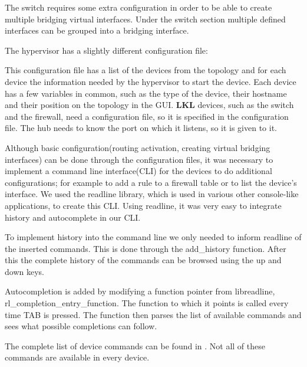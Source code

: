 The switch requires some extra configuration in order to be able to create multiple bridging virtual interfaces. 
Under the switch section multiple defined interfaces can be grouped into a bridging interface.

The hypervisor has a slightly different configuration file:
\lstset{language=text,caption=Example hypervisor configuration file,label=lst:hconf}

This configuration file has a list of the devices from the topology and for each device the information needed by the hypervisor to
start the device. Each device has a few variables in common, such as the type of the device, their hostname and their position on
the topology in the GUI. \textbf{LKL} devices, such as the switch and the firewall, need a configuration file, so it is specified in the
configuration file. The hub needs to know the port on which it listens, so it is given to it.

Although basic configuration(routing activation, creating virtual bridging interfaces) can be done through the 
configuration files, it was necessary to implement a command line interface(CLI) for the devices to do additional configurations; 
for example to add a rule to a firewall table or to list the device's interface. We used the readline library, which is used in various
other console-like applications, to create this CLI. Using readline, it was very easy to integrate history and autocomplete in our CLI.

To implement history into the command line we only needed to inform readline of the inserted commands. This is done through the
add_history function. After this the complete history of the commands can be browsed using the up and down keys.

Autocompletion is added by modifying a function pointer from libreadline, rl_completion_entry_function. The function to which it points
is called every time TAB is pressed. The function then parses the list of available commands and sees what possible completions
can follow. 

The complete list of device commands can be found in . Not all of these commands are available in every device.
